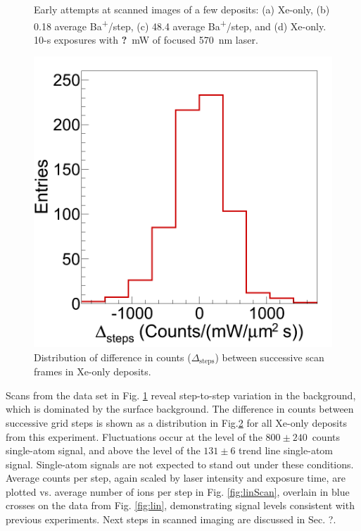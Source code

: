 \begin{figure}
                \caption{Early attempts at scanned images of a few deposits: (a) Xe-only, (b) 0.18 average Ba\textsuperscript{+}/step, (c) 48.4 average Ba\textsuperscript{+}/step, and (d) Xe-only.  10-s exposures with \textbf{\color{red}?}~mW of focused 570~nm laser.}
\label{fig:scans}
\end{figure}

\begin{figure} %
        \centering
                \includegraphics[width=.35\textwidth]{figures/scans_dframeXe.png}
                \caption{Distribution of difference in counts ($\Delta_{\text{steps}}$) between successive scan frames in Xe-only deposits.}
\label{fig:scanVarXe}
\end{figure}

Scans from the data set in Fig. \ref{fig:scans} reveal step-to-step variation in the background, which is dominated by the surface background.  The difference in counts between successive grid steps is shown as a distribution in Fig.\ref{fig:scanVarXe} for all Xe-only deposits from this experiment.  Fluctuations occur at the level of the $800 \pm 240$~counts single-atom signal, and above the level of the $131 \pm 6$ trend line single-atom signal.  Single-atom signals are not expected to stand out under these conditions.  Average counts per step, again scaled by laser intensity and exposure time, are plotted vs. average number of ions per step in Fig. \ref{fig:linScan}, overlain in blue crosses on the data from Fig. \ref{fig:lin}, demonstrating signal levels consistent with previous experiments.  Next steps in scanned imaging are discussed in Sec. ?.

